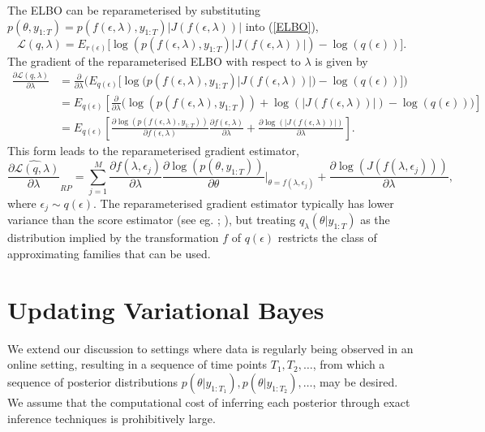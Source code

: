 \documentclass[12pt,a4paper]{article}\usepackage[]{graphicx}\usepackage[]{color}
\begin{document}
The ELBO can be reparameterised by substituting $p(\theta, y_{1:T}) = p(f(\epsilon, \lambda), y_{1:T})|J(f(\epsilon, \lambda))|$ into (\ref{ELBO}),
\begin{equation}
\label{rpELBO}
\mathcal{L}(q, \lambda) = E_{r(\epsilon)} \bigg[\log(p(f(\epsilon,\lambda), y_{1:T})|J(f(\epsilon, \lambda))|) - \log(q(\epsilon))\bigg].
\end{equation}
The gradient of the reparameterised ELBO with respect to $\lambda$ is given by 
\begin{align}
\label{rpELBODeriv}
\frac{\partial\mathcal{L}(q, \lambda)}{\partial \lambda} &= \frac{\partial}{\partial \lambda} \bigg( E_{q(\epsilon)} \bigg[\log\big(p(f(\epsilon,\lambda), y_{1:T})|J(f(\epsilon, \lambda))|\big) - \log(q(\epsilon))\bigg] \bigg) \nonumber \\
&= E_{q(\epsilon)} \left[ \frac{\partial}{\partial \lambda} \bigg(\log(p(f(\epsilon,\lambda), y_{1:T})) + \log(|J(f(\epsilon, \lambda))|) - \log(q(\epsilon)) \bigg)\right] \nonumber \\
&= E_{q(\epsilon)} \left[ \frac{\partial \log(p(f(\epsilon,\lambda), y_{1:T}))}{\partial f(\epsilon,\lambda)} \frac{\partial f(\epsilon,\lambda)}{\partial \lambda}  + \frac{\partial \log(|J(f(\epsilon, \lambda))|)}{\partial \lambda} \right].
\end{align}
This form leads to the reparameterised gradient estimator,
\begin{equation}
\label{rpDeriv}
\widehat{\frac{\partial\mathcal{L}(q, \lambda)}{\partial \lambda}}_{RP} = \sum_{j = 1}^M \frac{\partial f(\lambda, \epsilon_j)}{\partial \lambda} \frac{\partial \log(p(\theta, y_{1:T}))}{\partial \theta} \bigg\rvert_{\theta = f(\lambda, \epsilon_j)} + \frac{\partial \log(J(f(\lambda, \epsilon_j)))}{\partial \lambda}, 
\end{equation}
where $\epsilon_j \sim q(\epsilon)$. The reparameterised gradient estimator typically has lower variance than the score estimator (see eg. \cite{Rezende2014}; \cite{Ruiz2016}), but treating $q_{\lambda}(\theta | y_{1:T})$ as the distribution implied by the transformation $f$ of $q(\epsilon)$ restricts the class of approximating families that can be used.
\\

\section{Updating Variational Bayes}
\label{sec:UVB}

We extend our discussion to settings where data is regularly being observed in an online setting, resulting in a sequence of time points $T_1, T_2, \dots$, from which a sequence of posterior distributions $p(\theta | y_{1:T_1}), p(\theta | y_{1:T_2}), \dots$, may be desired. We assume that the computational cost of inferring each posterior through exact inference techniques is prohibitively large.
\\
\end{document}
